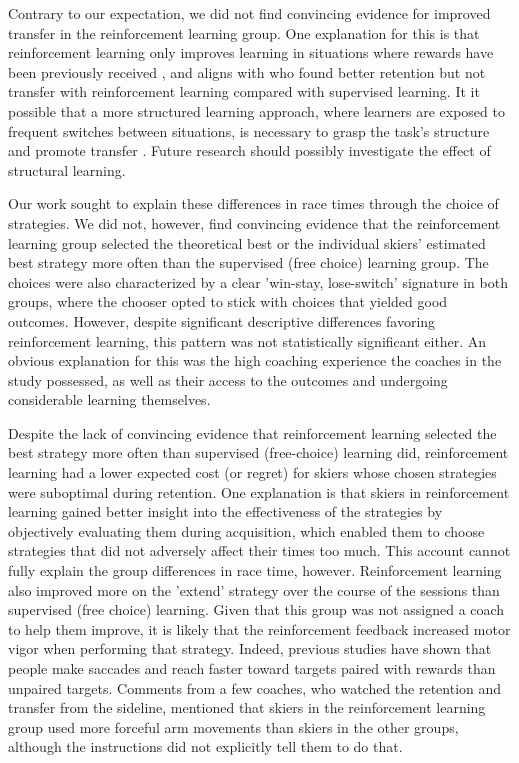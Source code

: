 \documentclass[pdflatex,sn-mathphys-num]{sn-jnl}%
\theoremstyle{thmstyleone}%
\theoremstyle{thmstyletwo}%
\theoremstyle{thmstylethree}%
\begin{document}
Contrary to our expectation, we did not find convincing evidence for improved transfer in the reinforcement learning group. One explanation for this is that reinforcement learning only improves learning in situations where rewards have been previously received \cite{robertson_memory_2018}, and aligns with \cite{hasson_reinforcement_2015} who found better retention but not transfer with reinforcement learning compared with supervised learning. It it possible that a more structured learning approach, where learners are exposed to frequent switches between situations, is necessary to grasp the task's structure and promote transfer \cite{braun_structure_2010}. Future research should possibly investigate the effect of structural learning. 

Our work sought to explain these differences in race times through the choice of strategies. We did not, however,  find convincing evidence that the reinforcement learning group selected the theoretical best or the individual skiers' estimated best strategy more often than the supervised (free choice) learning group. The choices were also characterized by a clear 'win-stay, lose-switch' signature in both groups, where the chooser opted to stick with choices that yielded good outcomes. However, despite significant descriptive differences favoring reinforcement learning, this pattern was not statistically significant either. An obvious explanation for this was the high coaching experience the coaches in the study possessed, as well as their access to the outcomes and undergoing considerable learning themselves. 

Despite the lack of convincing evidence that reinforcement learning selected the best strategy more often than supervised (free-choice) learning did, reinforcement learning had a lower expected cost (or regret) for skiers whose chosen strategies were suboptimal during retention. One explanation is that skiers in reinforcement learning gained better insight into the effectiveness of the strategies by objectively evaluating them during acquisition, which enabled them to choose strategies that did not adversely affect their times too much. This account cannot fully explain the group differences in race time, however. Reinforcement learning also improved more on the 'extend' strategy over the course of the sessions than supervised (free choice) learning. Given that this group was not assigned a coach to help them improve, it is likely that the reinforcement feedback increased motor vigor \cite{shadmehr_vigor_2020, pietro_mazzoni_why_2007, niv_normative_2006} when performing that strategy. Indeed, previous studies have shown that people make saccades \cite{takikawa_modulation_2002} and reach faster \cite{summerside_vigor_2018} toward targets paired with rewards than unpaired targets. Comments from a few coaches, who watched the retention and transfer from the sideline, mentioned that skiers in the reinforcement learning group used more forceful arm movements than skiers in the other groups, although the instructions did not explicitly tell them to do that.
\end{document}
